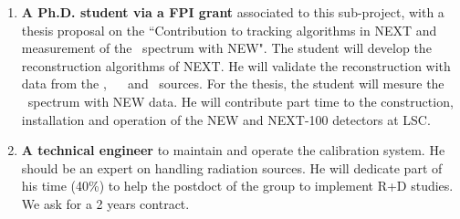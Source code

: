 \begin{enumerate}
\item {\bf A Ph.D. student via a FPI grant} associated to this sub-project, with a thesis proposal on the ``Contribution to tracking algorithms in NEXT and measurement of the \bb ~spectrum with NEW".
The student will develop the reconstruction algorithms of NEXT. He will validate the reconstruction with data from the \NA, ~\CS~ and \Tl ~sources. For the thesis, the student will mesure the \bb ~spectrum with NEW data.
He will contribute part time to the construction, installation and operation of the NEW and NEXT-100 detectors at LSC. %


\item {\bf A technical engineer} to maintain and operate the calibration system. He should be an expert on handling radiation sources. He will dedicate part of his time (40\%) to help the postdoct of the group to implement R+D studies. We ask for a 2 years contract.





\end{enumerate}
